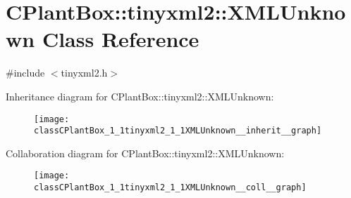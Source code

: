 \hypertarget{classCPlantBox_1_1tinyxml2_1_1XMLUnknown}{}\section{C\+Plant\+Box\+:\+:tinyxml2\+:\+:X\+M\+L\+Unknown Class Reference}
\label{classCPlantBox_1_1tinyxml2_1_1XMLUnknown}


{\ttfamily \#include $<$tinyxml2.\+h$>$}



Inheritance diagram for C\+Plant\+Box\+:\+:tinyxml2\+:\+:X\+M\+L\+Unknown\+:\nopagebreak
\begin{figure}[H]
\begin{center}
\leavevmode
\texttt{[image: classCPlantBox\_1\_1tinyxml2\_1\_1XMLUnknown\_\_inherit\_\_graph]}
\end{center}
\end{figure}


Collaboration diagram for C\+Plant\+Box\+:\+:tinyxml2\+:\+:X\+M\+L\+Unknown\+:\nopagebreak
\begin{figure}[H]
\begin{center}
\leavevmode
\texttt{[image: classCPlantBox\_1\_1tinyxml2\_1\_1XMLUnknown\_\_coll\_\_graph]}
\end{center}
\end{figure}

